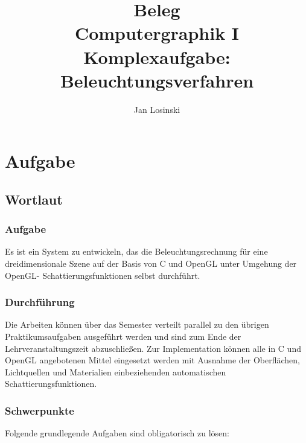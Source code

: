 \documentclass[final,a4paper,11pt,notitlepage,halfparskip]{scrreprt}
\title{Beleg\\
Computergraphik I\\
Komplexaufgabe: Beleuchtungsverfahren}
\author{Jan Losinski}
\begin{document}
\maketitle

\tableofcontents

\chapter{Aufgabe}
\section{Wortlaut}
\subsection{Aufgabe}
Es ist ein System zu entwickeln, das die Beleuchtungsrechnung für eine dreidimensionale
Szene auf der Basis von C und OpenGL unter Umgehung der OpenGL-
Schattierungsfunktionen selbst durchführt.

\subsection{Durchführung}
Die Arbeiten können über das Semester verteilt parallel zu den übrigen Praktikumsaufgaben
ausgeführt werden und sind zum Ende der Lehrveranstaltungszeit abzuschließen. Zur
Implementation können alle in C und OpenGL angebotenen Mittel eingesetzt werden mit
Ausnahme der Oberflächen, Lichtquellen und Materialien einbeziehenden automatischen
Schattierungsfunktionen.

\subsection{Schwerpunkte}
Folgende grundlegende Aufgaben sind obligatorisch zu lösen:
\end{document}
